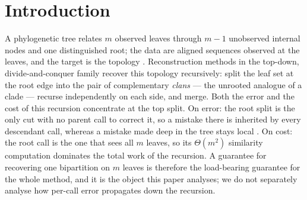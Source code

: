 %
%
%

\section{Introduction}\label{sec:intro}

A phylogenetic tree relates $m$ observed leaves through $m-1$ unobserved
internal nodes and one distinguished root; the data are aligned sequences
observed at the leaves, and the target is the topology
\cite{aizenbud2023spectral, semple2003phylogenetics}. Reconstruction methods
in the top-down, divide-and-conquer family recover this topology
recursively: split the leaf set at the root edge into the pair of
complementary \emph{clans} --- the unrooted analogue of a clade
\cite{wilkinson2007clades} --- recurse independently on each side, and
merge. Both the error and the cost of this recursion concentrate at the top
split. On error: the root split is the only cut with no parent call to
correct it, so a mistake there is inherited by every descendant call,
whereas a mistake made deep in the tree stays local
\cite{aizenbud2023spectral}. On cost: the root call is the one that sees all
$m$ leaves, so its $\Theta(m^2)$ similarity computation dominates the total
work of the recursion. A guarantee for recovering one bipartition on $m$
leaves is therefore the load-bearing guarantee for the whole method, and it
is the object this paper analyses; we do not separately analyse how
per-call error propagates down the recursion.

